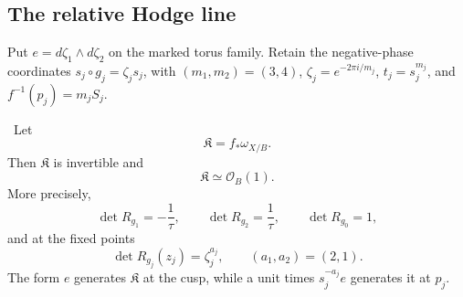 \subsection{The relative Hodge line}
Put $e=d\zeta_1\wedge d\zeta_2$ on the marked torus family.
Retain the negative-phase coordinates $s_j\circ g_j=\zeta_js_j$,
with $(m_1,m_2)=(3,4)$, $\zeta_j=e^{-2\pi i/m_j}$,
$t_j=s_j^{m_j}$, and $f^{-1}(p_j)=m_jS_j$.
\begin{lemma}
\label{mapsI:hodge:line}
\ Let
\[
 \mathfrak K=f_*\omega_{X/B}.
\]
Then \(\mathfrak K\) is invertible and
\[
 \mathfrak K\simeq\mathcal O_B(1).
\tag{HL.9.1}
\]
More precisely,
\[
 \det R_{g_1}=-\frac1\tau,\qquad
 \det R_{g_2}=\frac1\tau,\qquad
 \det R_{g_0}=1,
\tag{HL.9.2}
\]
and at the fixed points
\[
 \det R_{g_j}(z_j)=\zeta_j^{a_j},
 \qquad (a_1,a_2)=(2,1).
\tag{HL.9.3}
\]
The form \(e\) generates \(\mathfrak K\) at the cusp, while a unit times
\(s_j^{-a_j}e\) generates it at \(p_j\).
\end{lemma}

